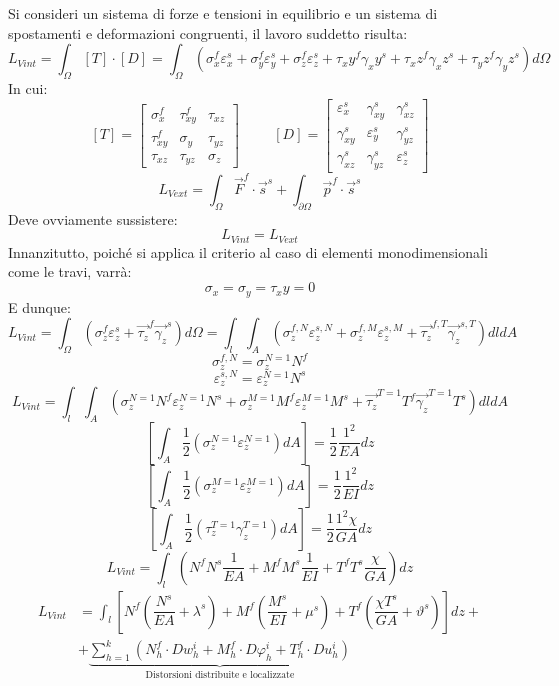 \documentclass{article}
\begin{document}
\begin{adjustwidth}{2in}{}
		Si consideri un sistema di forze e tensioni in equilibrio e un sistema di spostamenti e deformazioni
		congruenti, il lavoro suddetto risulta:
		\[ 
		L_{Vint} = \int_{\Omega}[T]\cdot[D] = \int_{\Omega}  \left( \sigma_x^f\varepsilon_x^s + \sigma_y^f\varepsilon_y^s + \sigma_z^f\varepsilon_z^s + \tau_xy^f\gamma_xy^s + \tau_xz^f\gamma_xz^s +\tau_yz^f\gamma_yz^s \right) d\Omega
		\]
		In cui: 
		\[		
		[T] = \left[ \begin{array}{ccc}
			\sigma_x^f & \tau_{xy}^f & \tau_{xz} \\
			\tau_{xy}^f & \sigma_y & \tau_{yz} \\
			\tau_{xz} & \tau_{yz} & \sigma_z
		\end{array}\right] \hspace{1cm} [D] = \left[ \begin{array}{ccc}
		\varepsilon_x^s & \gamma_{xy}^s & \gamma_{xz}^s \\
		\gamma_{xy}^s & \varepsilon_y^s & \gamma_{yz}^s \\
		\gamma_{xz}^s & \gamma_{yz}^s & \varepsilon_z^s
		\end{array}\right] 	
		\]
		\[L_{Vext} = \int_{\Omega}\vec{F}^f \cdot \vec{s}^s +\int_{\partial\Omega}\vec{p}^f \cdot \vec{s}^s  \]
		Deve ovviamente sussistere: 
		\[L_{Vint} = L_{Vext}\]
		Innanzitutto, poiché si applica il criterio al caso di elementi monodimensionali come le travi, varrà:
		\[\sigma_x = \sigma_y = \tau_xy = 0\]
		E dunque:
		\[ 
		L_{Vint} = \int_{\Omega}  \left( \sigma_z^f\varepsilon_z^s +  \vec{\tau_z}^f\vec{\gamma_z}^s \right) d\Omega = \int_{l}\int_{A} \left( \sigma_z^{f,N}\varepsilon_z^{s,N} + \sigma_z^{f,M}\varepsilon_z^{s,M}+ \vec{\tau_z}^{f, T}\vec{\gamma_z}^{s,T} \right) dldA 
		\]
		\[ \sigma_z^{f,N} = \sigma_z^{N=1}N^f\]
		\[ \varepsilon_z^{s,N} = \varepsilon_z^{N=1}N^s\]
		\[ 
		L_{Vint} = \int_{l}\int_{A} \left( \sigma_z^{N=1}N^f\varepsilon_z^{N=1}N^s + \sigma_z^{M=1}M^f\varepsilon_z^{M=1}M^s+ \vec{\tau_z}^{T=1}T^f\vec{\gamma_z}^{T=1}T^s \right) dldA 
		\]
		\[\left[  \int_{A}\dfrac{1}{2}  \left( \sigma_z^{N=1}\varepsilon_z^{N=1}\right) dA\right] = \dfrac{1}{2} \dfrac{1^2}{EA} dz \]
		\[\left[  \int_{A}\dfrac{1}{2}  \left( \sigma_z^{M=1}\varepsilon_z^{M=1}\right) dA\right] = \dfrac{1}{2} \dfrac{1^2}{EI} dz \]
		\[\left[  \int_{A}\dfrac{1}{2}  \left( \tau_z^{T=1}\gamma_z^{T=1}\right) dA\right] = \dfrac{1}{2} \dfrac{1^2\chi}{GA} dz \]
		\[ 
		L_{Vint} = \int_{l} \left( N^fN^s\dfrac{1}{EA} + M^fM^s \dfrac{1}{EI} + T^fT^s\dfrac{\chi}{GA} \right) dz
		\]
		\[ 
		\begin{split}
		L_{Vint} & = \int_{l} \left[  N^f \left( \dfrac{N^s}{EA} +\lambda^s \right)  + M^f\left( \dfrac{M^s}{EI} +\mu^s \right) + T^f\left( \dfrac{\chi T^s}{GA} +\vartheta^s \right) \right] dz + \\
		& + \underbrace{\sum_{h=1}^{k}\left( N_h^f \cdot Dw_h^i + M_h^f \cdot D\varphi_h^i + T_h^f \cdot Du_h^i \right)}_{\text{Distorsioni distribuite e localizzate}}
		\end{split}		
		\]


\end{adjustwidth}
\end{document}
